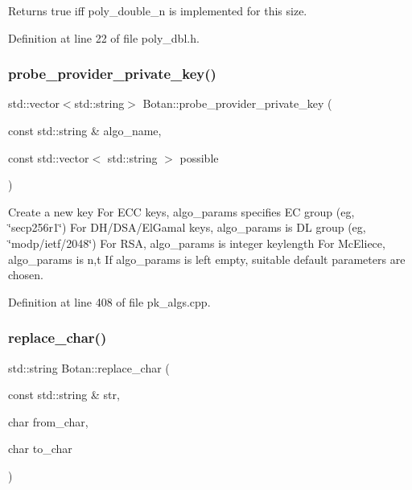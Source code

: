 Returns true iff poly\+\_\+double\+\_\+n is implemented for this size. 

Definition at line 22 of file poly\+\_\+dbl.\+h.

\mbox{\label{namespace_botan_ac80126ae204756cd304ffeab9085c6f4}} 
\subsubsection{\texorpdfstring{probe\+\_\+provider\+\_\+private\+\_\+key()}{probe\_provider\_private\_key()}}
{\footnotesize\ttfamily std\+::vector$<$std\+::string$>$ Botan\+::probe\+\_\+provider\+\_\+private\+\_\+key (\begin{DoxyParamCaption}\item[{const std\+::string \&}]{algo\+\_\+name,  }\item[{const std\+::vector$<$ std\+::string $>$}]{possible }\end{DoxyParamCaption})}

Create a new key For E\+CC keys, algo\+\_\+params specifies EC group (eg, \char`\"{}secp256r1\char`\"{}) For D\+H/\+D\+S\+A/\+El\+Gamal keys, algo\+\_\+params is DL group (eg, \char`\"{}modp/ietf/2048\char`\"{}) For R\+SA, algo\+\_\+params is integer keylength For Mc\+Eliece, algo\+\_\+params is n,t If algo\+\_\+params is left empty, suitable default parameters are chosen. 

Definition at line 408 of file pk\+\_\+algs.\+cpp.

\mbox{\label{namespace_botan_a292061a5124df501cb59c2f899f78235}} 
\subsubsection{\texorpdfstring{replace\+\_\+char()}{replace\_char()}}
{\footnotesize\ttfamily std\+::string Botan\+::replace\+\_\+char (\begin{DoxyParamCaption}\item[{const std\+::string \&}]{str,  }\item[{char}]{from\+\_\+char,  }\item[{char}]{to\+\_\+char }\end{DoxyParamCaption})}

